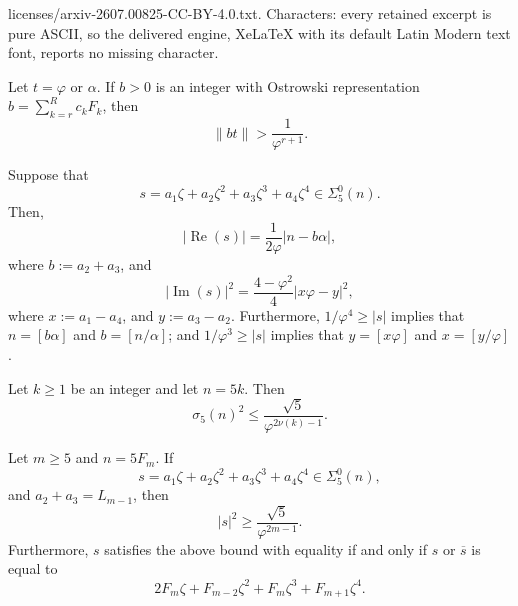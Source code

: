 \documentclass[10pt,a4paper]{amsart}
\DeclareMathOperator{\im}{Im}
\DeclareMathOperator{\re}{Re}
\newcommand{\ph}{\varphi}
\newcommand{\z}{\zeta}
\begin{document}
licenses/arxiv-2607.00825-CC-BY-4.0.txt. Characters: every retained excerpt is pure ASCII, so the delivered engine, XeLaTeX with its default Latin Modern text font, reports no missing character.
\begin{lem}\label{lem:2} Let $t=\ph$ or $\alpha$. If $b>0$ is an integer with Ostrowski representation
  $b=\sum_{k=r}^{R}c_{k}F_{k}$,
 then
  \begin{equation}\label{eq:lem2}
    \|bt\|>\frac{1}{\ph^{r+1}}.
  \end{equation}
\end{lem}

\begin{lem}\label{lem:bnxy}
    Suppose that  \[s=a_1\z+a_2\z^2+a_3\z^3+a_4\z^4\in\Sigma_5^0(n).\]
    Then,
    \[|\re(s)|=\frac{1}{2\ph}|n-b\alpha|,\]
    where $b:=a_2+a_3$, and
    \[|\im(s)|^2=\frac{4-\ph^2}{4}|x\ph- y|^2,\]
    where $x:=a_1-a_4$, and $y:=a_3-a_2$. Furthermore,  $1/\ph^{4}\geq |s|$ implies that $n=[b\alpha]$ and $b=[n/\alpha]$; and $1/\ph^3\geq |s|$ implies that $y=[x\ph]$ and $x=[y/\ph]$.
\end{lem}

\begin{lem} \label{lem:ub2} Let $k\geq 1$ be an integer and let $n=5k$. Then
  \[\sigma_5(n)^2\leq \frac{\sqrt{5}}{\ph^{2\nu(k)-1}}.\]
\end{lem}

\begin{prop}\label{prop:1f} Let $m\geq 5$ and $n=5F_{m}$. If \[s=a_1\z+a_2\z^2+a_3\z^3+a_4\z^4\in\Sigma_5^0(n),\]
 and $a_2+a_3=L_{m-1}$, then
  \[|s|^2\geq \frac{\sqrt{5}}{\ph^{2m-1}}.\]
 Furthermore, $s$ satisfies the above bound with equality if and only if $s$ or $\overline{s}$ is equal to
  \[2F_m\z + F_{m-2}\z^2 +F_m\z^3+F_{m+1}\z^4.\]
\end{prop}
\end{document}
